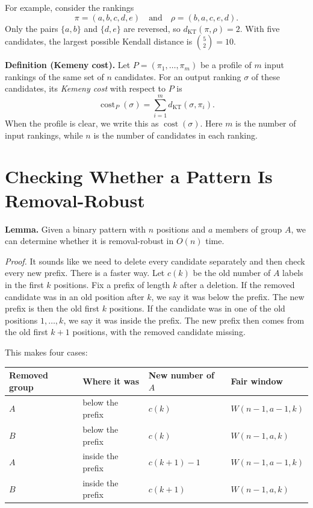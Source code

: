 \documentclass[11pt]{article}
\newcommand{\KT}{d_{\mathrm{KT}}}
\begin{document}
For example, consider the rankings
\[
 \pi=(a,b,c,d,e)
 \quad\text{and}\quad
 \rho=(b,a,c,e,d).
\]
Only the pairs $\{a,b\}$ and $\{d,e\}$ are reversed, so
$\KT(\pi,\rho)=2$.  With five candidates, the largest possible Kendall
distance is $\binom{5}{2}=10$.

\medskip
\noindent\textbf{Definition (Kemeny cost).}
Let $P=(\pi_1,\ldots,\pi_m)$ be a profile of $m$ input rankings of the same
set of $n$ candidates.  For an output ranking $\sigma$ of these candidates,
its \emph{Kemeny cost} with respect to $P$ is
\[
 \operatorname{cost}_P(\sigma)
 =\sum_{i=1}^{m}\KT(\sigma,\pi_i).
\]
When the profile is clear, we write this as $\operatorname{cost}(\sigma)$.
Here $m$ is the number of input rankings, while $n$ is the number of
candidates in each ranking.
\medskip

\section{Checking Whether a Pattern Is Removal-Robust}

\medskip
\noindent\textbf{Lemma.}
Given a binary pattern with $n$ positions and $a$ members of group $A$, we
can determine whether it is removal-robust in $O(n)$ time.
\medskip

\noindent\textit{Proof.}
It sounds like we need to delete every candidate separately and then check
every new prefix.  There is a faster way.  Let $c(k)$ be the old number of
$A$ labels in the first $k$ positions.  Fix a prefix of length $k$ after a
deletion.  If the removed candidate was in an old position after $k$, we say
it was below the prefix.  The new prefix is then the old first $k$ positions.
If the candidate was in one of the old positions $1,\ldots,k$, we say it was
inside the prefix.  The new prefix then comes from the old first $k+1$
positions, with the removed candidate missing.

This makes four cases:

\begin{center}
\begin{tabular}{@{}llll@{}}
\toprule
Removed group & Where it was & New number of $A$ & Fair window \\
\midrule
$A$ & below the prefix & $c(k)$ & $W(n-1,a-1,k)$ \\
$B$ & below the prefix & $c(k)$ & $W(n-1,a,k)$ \\
$A$ & inside the prefix & $c(k+1)-1$ & $W(n-1,a-1,k)$ \\
$B$ & inside the prefix & $c(k+1)$ & $W(n-1,a,k)$ \\
\bottomrule
\end{tabular}
\end{center}
\end{document}
